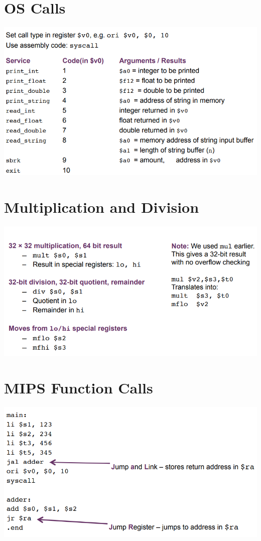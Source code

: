 \documentclass{article}[18pt]
\begin{document}
\section{OS Calls}
\includegraphics[scale=0.7]{OS-Call}
\section{Multiplication and Division}
\includegraphics[scale=0.7]{Mult}
\section{MIPS Function Calls}
\includegraphics[scale=0.7]{Function}
\end{document}
